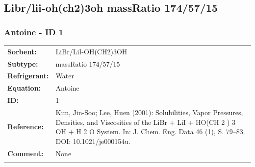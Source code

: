 \subsection{Libr/lii-oh(ch2)3oh massRatio 174/57/15}
%
\subsubsection{Antoine - ID 1}
%
\begin{tabular}[l]{|lp{11.5cm}|}
\hline
\addlinespace

\textbf{Sorbent:} & LiBr/LiI-OH(CH2)3OH \\
\textbf{Subtype:} & massRatio 174/57/15 \\
\textbf{Refrigerant:} & Water \\
\textbf{Equation:} & Antoine \\
\textbf{ID:} & 1 \\
\textbf{Reference:} & Kim, Jin-Soo; Lee, Huen (2001): Solubilities, Vapor Pressures, Densities, and Viscosities of the LiBr + LiI + HO(CH 2 ) 3 OH + H 2 O System. In: J. Chem. Eng. Data 46 (1), S. 79–83. DOI: 10.1021/je000154u. \\
\textbf{Comment:} & None \\

\addlinespace
\hline
\end{tabular}
\newline

